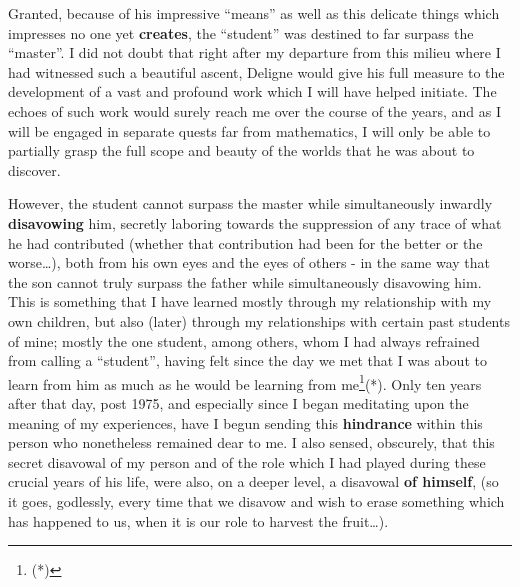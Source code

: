 Granted, because of his impressive ``means'' as well as this delicate things which
impresses no one yet \textbf{creates}, the ``student'' was destined to far surpass the
``master''. I did not doubt that right after my departure from this milieu where I had
witnessed such a beautiful ascent, Deligne would give his full measure 
to the development of a vast and profound work which I will have helped initiate.
The echoes of such work would surely reach me over the course of the years, 
and as I will be engaged in separate quests far from mathematics,
I will only be able to partially grasp the full scope and beauty of the worlds that he was
about to discover. 

However, the student cannot surpass the master while simultaneously inwardly
\textbf{disavowing} him, secretly laboring towards the suppression of any trace of what he
had contributed (whether that contribution had been for the better or the worse\ldots),
both from his own eyes and the eyes of others - in the same way that the son cannot truly
surpass the father while simultaneously disavowing him. 
This is something that I have learned mostly through my relationship with my own children,
but also (later) through my relationships with certain past students of mine; 
mostly the one student, among others, whom I had always refrained from calling a
``student'', having felt since the day we met
that I was about to learn from him as much as he would be learning from
me\footnote{(*)}(*).
Only ten years after that day, post 1975, and especially since I began meditating upon the
meaning of my experiences, have I begun sending this \textbf{hindrance} within 
this person who nonetheless remained dear to me.
I also sensed, obscurely, that this secret disavowal of my person and of the role which I
had played during these crucial years of his life, were also, on a deeper
level, a disavowal \textbf{of himself},
(so it goes, godlessly, every time that we disavow and wish to erase 
something which has
happened to us, when it is our role to harvest the fruit\ldots).

